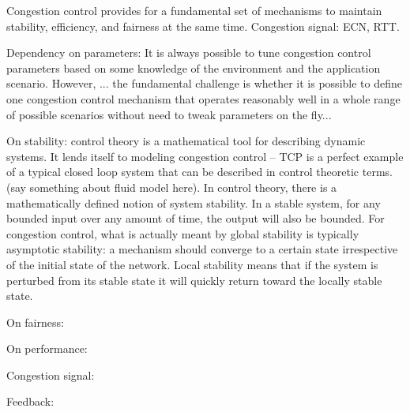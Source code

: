 Congestion control provides for a fundamental set of mechanisms to maintain
stability, efficiency, and fairness at the same time. Congestion signal: ECN,
RTT.

Dependency on parameters: It is always possible to tune congestion control
parameters based on some knowledge of the environment and the application
scenario. However, ... the fundamental challenge is whether it is possible to
define one congestion control mechanism that operates reasonably well in a whole
range of possible scenarios without need to tweak parameters on the fly...


On stability: control theory is a mathematical tool for describing dynamic
systems. It lends itself to modeling congestion control -- TCP is a perfect
example of a typical closed loop system that can be described in control
theoretic terms. (say something about fluid model here). In control theory,
there is a mathematically defined notion of system stability.  In a stable
system, for any bounded input over any amount of time, the output will also be
bounded.  For congestion control, what is actually meant by global  stability is
typically asymptotic stability: a mechanism should converge to a certain state
irrespective of the initial state of the network. Local stability means that if
the system is perturbed from its stable state it will quickly return toward the
locally stable state.


On fairness: 


On performance:

Congestion signal:

Feedback:



